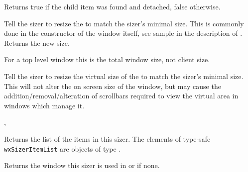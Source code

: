 Returns true if the child item was found and detached, false otherwise.




\label{wxsizerfit}


Tell the sizer to resize the  to match the sizer's minimal size. This
is commonly done in the constructor of the window itself, see sample in the description
of . Returns the new size.

For a top level window this is the total window size, not client size.


\label{wxsizerfitinside}


Tell the sizer to resize the virtual size of the  to match the sizer's
minimal size.  This will not alter the on screen size of the window, but may cause
the addition/removal/alteration of scrollbars required to view the virtual area in
windows which manage it.


,\rtfsp
{}


\label{wxsizergetchildren}


Returns the list of the items in this sizer. The elements of type-safe 
 \texttt{wxSizerItemList} are objects of type 
.


\label{wxsizergetcontainingwindow}


Returns the window this sizer is used in or \NULL if none.


\label{wxsizergetitem}



